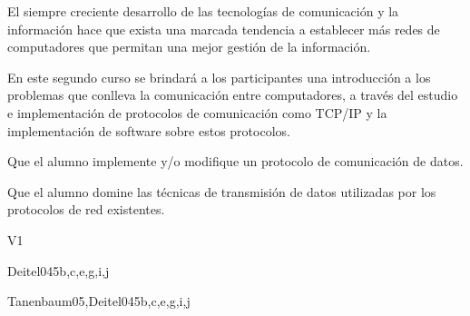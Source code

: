 \begin{syllabus}


\begin{justification}
El siempre creciente desarrollo de las tecnologías de comunicación y la
información hace que exista una marcada tendencia a  establecer
más redes de computadores que permitan una mejor
gestión de la información.

En este segundo curso se brindará a los participantes una introducción a los
problemas que conlleva la comunicación entre computadores, a través del
estudio e implementación de protocolos de comunicación como TCP/IP y
la implementación de software sobre estos protocolos.
\end{justification}

\begin{goals}
\item Que el alumno implemente y/o modifique un protocolo de comunicación de datos.
\item Que el alumno domine las técnicas de transmisión de datos utilizadas por los protocolos de red existentes.
\end{goals}

\begin{outcomes}{V1}
        \item {}
        \item {}
        \item {}
        \item {}
        \item {}
        \item {}
\end{outcomes}

\begin{unit}{\PLEventDrivenandReactiveProgramming}{}{Deitel04}{5}{b,c,e,g,i,j}
        \PLEventDrivenandReactiveProgrammingAllTopics
        \PLEventDrivenandReactiveProgrammingAllLearningOutcomes
\end{unit}

\begin{unit}{\IASNetworkSecurity}{}{Tanenbaum05,Deitel04}{5}{b,c,e,g,i,j}
        \IASNetworkSecurityAllTopics
        \IASNetworkSecurityAllLearningOutcomes
\end{unit}


\end{syllabus}
